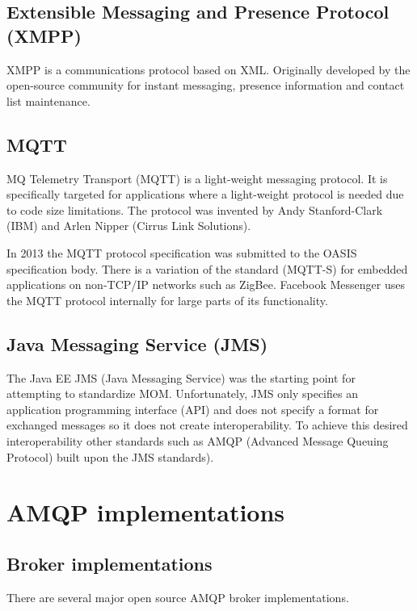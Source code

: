 \documentclass{thesis}
\begin{document}
\subsection{Extensible Messaging and Presence Protocol (XMPP)}
XMPP is a communications protocol based on XML.  Originally developed by the open-source community for instant messaging, presence information and contact list maintenance.  %

\subsection{MQTT}
MQ Telemetry Transport (MQTT) is a light-weight messaging protocol.  It is specifically targeted for applications where a light-weight protocol is needed due to code size limitations.  The protocol was invented by Andy Stanford-Clark (IBM) and Arlen Nipper (Cirrus Link Solutions).  

In 2013 the MQTT protocol specification was submitted to the OASIS specification body.  There is a variation of the standard (MQTT-S) for embedded applications on non-TCP/IP networks such as ZigBee.  Facebook Messenger uses the MQTT protocol internally for large parts of its functionality. 


\subsection{Java Messaging Service (JMS)}
The Java EE JMS (Java Messaging Service) was the starting point for attempting to standardize MOM. Unfortunately, JMS only specifies an application programming interface (API) and does not specify a format for exchanged messages so it does not create interoperability.   To achieve this desired interoperability other standards such as AMQP (Advanced Message Queuing Protocol) built upon the JMS standards). 

\section{AMQP implementations}

\subsection{Broker implementations}

There are several major open source AMQP broker implementations.  
\end{document}
